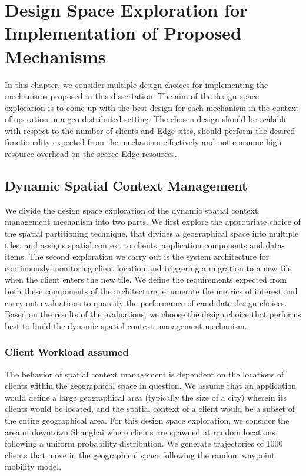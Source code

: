 \chapter{Design Space Exploration for Implementation of Proposed Mechanisms}
\label{sec:design_space_exploration}

In this chapter, we consider multiple design choices for implementing the mechanisms proposed in this dissertation. The aim of the design space exploration is to come up with the best design for each mechanism in the context of operation in a geo-distributed setting. The chosen design should be scalable with respect to the number of clients and Edge sites, should perform the desired functionality expected from the mechanism effectively and not consume high resource overhead on the scarce Edge resources.

\section{Dynamic Spatial Context Management}

We divide the design space exploration of the dynamic spatial context management mechanism into two parts. We first explore the appropriate choice of the spatial partitioning technique, that divides a geographical space into multiple tiles, and assigns spatial context to clients, application components and data-items. The second exploration we carry out is the system architecture for continuously monitoring client location and triggering a migration to a new tile when the client enters the new tile. We define the requirements expected from both these components of the architecture, enumerate the metrics of interest and carry out evaluations to quantify the performance of candidate design choices. Based on the results of the evaluations, we choose the design choice that performs best to build the dynamic spatial context management mechanism.

\subsection{Client Workload assumed}
The behavior of spatial context management is dependent on the locations of clients within the geographical space in question. We assume that an application would define a large geographical area (typically the size of a city) wherein its clients would be located, and the spatial context of a client would be a subset of the entire geographical area. For this design space exploration, we consider the area of downtown Shanghai where clients are spawned at random locations following a uniform probability distribution. We generate trajectories of 1000 clients that move in the geographical space following the random waypoint mobility model. 

